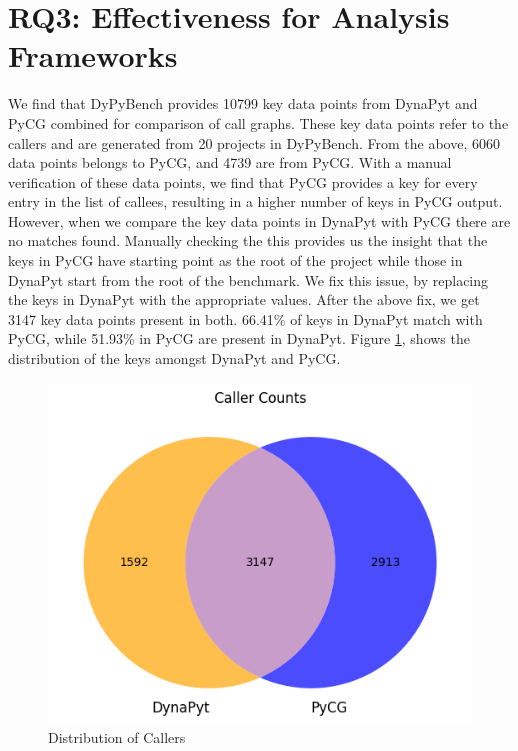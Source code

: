 \section{RQ3: Effectiveness for Analysis Frameworks}
We find that DyPyBench provides 10799 key data points from DynaPyt and PyCG combined for comparison of call graphs.
These key data points refer to the callers and are generated from 20 projects in DyPyBench.
From the above, 6060 data points belongs to PyCG, and 4739 are from PyCG.
With a manual verification of these data points, we find that PyCG provides a key for every entry in the list of callees, resulting in a higher number of keys in PyCG output.
However, when we compare the key data points in DynaPyt with PyCG there are no matches found.
Manually checking the this provides us the insight that the keys in PyCG have starting point as the root of the project while those in DynaPyt start from the root of the benchmark.
We fix this issue, by replacing the keys in DynaPyt with the appropriate values.
After the above fix, we get 3147 key data points present in both.
66.41\% of keys in DynaPyt match with PyCG, while 51.93\% in PyCG are present in DynaPyt.
Figure \ref{fig:caller counts}, shows the distribution of the keys amongst DynaPyt and PyCG.
\begin{figure}[ht]
    \centering
    \includegraphics[width=0.3\linewidth]{figures/evaluation/callercounts.png}
    \caption[Distribution of Callers]{\label{fig:caller counts}Distribution of Callers }
\end{figure}

